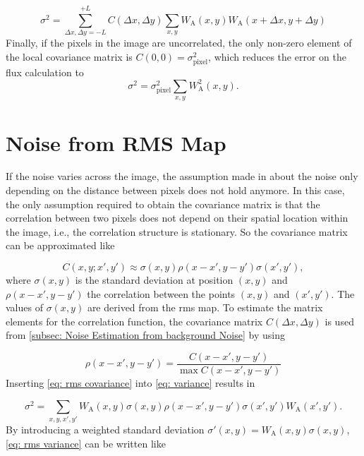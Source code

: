 \begin{equation}\label{eq: variance correlated}
    \sigma^2 = \sum_{\Delta x, \Delta y=-L}^{+L}C(\Delta x, \Delta y)\sum_{x,y}W_\mathrm{A}(x,y)W_\mathrm{A}(x+\Delta x,y + \Delta y)
\end{equation}
Finally, if the pixels in the image are uncorrelated, the only non-zero element of the local covariance matrix is $C(0,0) = \sigma_\mathrm{pixel}^2$, which reduces the error on the flux calculation to
\begin{equation}\label{eq: variance uncorrelated}
    \sigma^2 = \sigma^2_\mathrm{pixel}\sum_{x,y}W^2_\mathrm{A}(x,y).
\end{equation}

\newpage
\section{Noise from RMS Map}\label{subsec: Noise from RMS}
If the noise varies across the image, the assumption made in  about the noise only depending on the distance between pixels does not hold anymore. In this case, the only assumption required to obtain the covariance matrix is that the correlation between two pixels does not depend on their spatial location within the image, i.e., the correlation structure is stationary. So the covariance matrix can be approximated like

\begin{equation}\label{eq: rms covariance}
    C(x,y;x',y') \approx \sigma(x,y)\rho(x-x',y-y')\sigma(x',y'),
\end{equation}
where $\sigma(x,y)$ is the standard deviation at position $(x,y)$ and $\rho(x-x',y-y')$ the correlation between the points $(x,y)$ and $(x',y')$. The values of $\sigma(x,y)$ are derived from the \gls{rms} map. To estimate the matrix elements for the correlation function, the covariance matrix $C(\Delta x, \Delta y)$ is used from \autoref{subsec: Noise Estimation from background Noise} by using 

\begin{equation}
    \rho(x-x',y-y')=\frac{C(x-x',y-y')}{\max C(x-x',y-y')}
\end{equation}
Inserting \autoref{eq: rms covariance} into \autoref{eq: variance} results in

\begin{equation}\label{eq: rms variance}
    \sigma^2=\sum_{x,y,x',y'}W_\mathrm{A}(x,y)\sigma(x,y)\rho(x-x',y-y')\sigma(x',y')W_\mathrm{A}(x',y').
\end{equation}
By introducing a weighted standard deviation $\sigma'(x,y)=W_\mathrm{A}(x,y)\sigma(x,y)$, \autoref{eq: rms variance} can be written like

